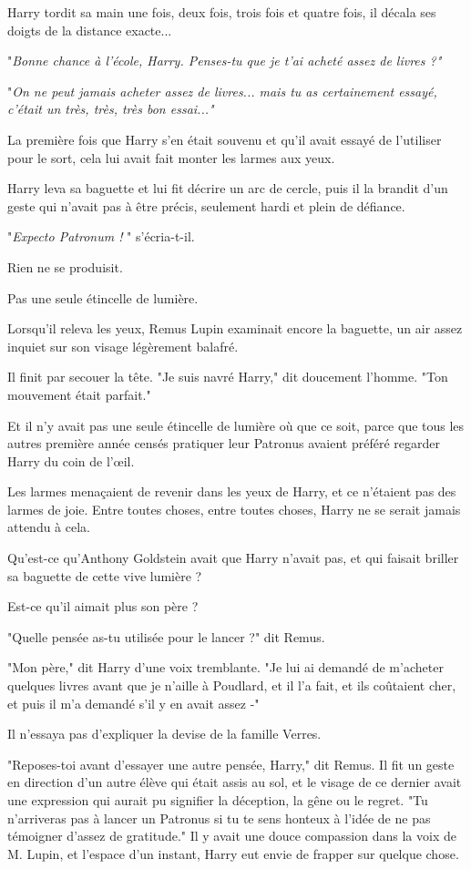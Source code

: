 Harry tordit sa main une fois, deux fois, trois fois et quatre fois, il décala ses doigts de la distance exacte...

"\emph{Bonne chance à l'école, Harry. Penses-tu que je t'ai acheté assez de livres ?"} 

"\emph{On ne peut jamais acheter assez de livres... mais tu as certainement essayé, c'était un très, très, très bon essai..."} 

La première fois que Harry s'en était souvenu et qu'il avait essayé de l'utiliser pour le sort, cela lui avait fait monter les larmes aux yeux.

Harry leva sa baguette et lui fit décrire un arc de cercle, puis il la brandit d'un geste qui n'avait pas à être précis, seulement hardi et plein de défiance.

"\emph{Expecto Patronum !} " s'écria-t-il.

Rien ne se produisit.

Pas une seule étincelle de lumière.

Lorsqu'il releva les yeux, Remus Lupin examinait encore la baguette, un air assez inquiet sur son visage légèrement balafré.

Il finit par secouer la tête. "Je suis navré Harry," dit doucement l'homme. "Ton mouvement était parfait."

Et il n'y avait pas une seule étincelle de lumière où que ce soit, parce que tous les autres première année censés pratiquer leur Patronus avaient préféré regarder Harry du coin de l'œil.

Les larmes menaçaient de revenir dans les yeux de Harry, et ce n'étaient pas des larmes de joie. Entre toutes choses, entre toutes choses, Harry ne se serait jamais attendu à cela.

Qu'est-ce qu'Anthony Goldstein avait que Harry n'avait pas, et qui faisait briller sa baguette de cette vive lumière ?

Est-ce qu'il aimait plus son père ?

"Quelle pensée as-tu utilisée pour le lancer ?" dit Remus.

"Mon père," dit Harry d'une voix tremblante. "Je lui ai demandé de m'acheter quelques livres avant que je n'aille à Poudlard, et il l'a fait, et ils coûtaient cher, et puis il m'a demandé s'il y en avait assez -"

Il n'essaya pas d'expliquer la devise de la famille Verres.

"Reposes-toi avant d'essayer une autre pensée, Harry," dit Remus. Il fit un geste en direction d'un autre élève qui était assis au sol, et le visage de ce dernier avait une expression qui aurait pu signifier la déception, la gêne ou le regret. "Tu n'arriveras pas à lancer un Patronus si tu te sens honteux à l'idée de ne pas témoigner d'assez de gratitude." Il y avait une douce compassion dans la voix de M. Lupin, et l'espace d'un instant, Harry eut envie de frapper sur quelque chose.

